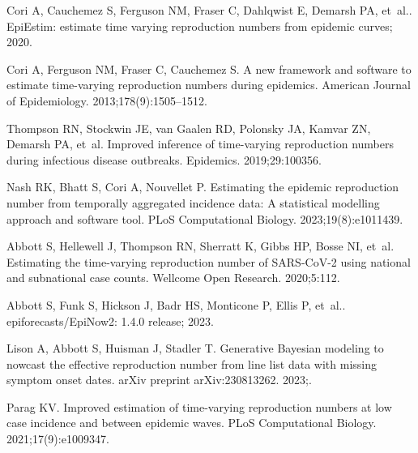 \documentclass[10pt,letterpaper]{article}
\begin{document}
\nolinenumbers

%
%
% 
\begin{thebibliography}{10}

  Cori A, Cauchemez S, Ferguson NM, Fraser C, Dahlqwist E, Demarsh PA, et~al..
    {EpiEstim}: estimate time varying reproduction numbers from epidemic curves;
    2020.
  
  Cori A, Ferguson NM, Fraser C, Cauchemez S.
  \newblock A new framework and software to estimate time-varying reproduction
    numbers during epidemics.
  \newblock American Journal of Epidemiology. 2013;178(9):1505--1512.
  
  Thompson RN, Stockwin JE, van Gaalen RD, Polonsky JA, Kamvar ZN, Demarsh PA,
    et~al.
  \newblock Improved inference of time-varying reproduction numbers during
    infectious disease outbreaks.
  \newblock Epidemics. 2019;29:100356.
  
  Nash RK, Bhatt S, Cori A, Nouvellet P.
  \newblock Estimating the epidemic reproduction number from temporally
    aggregated incidence data: A statistical modelling approach and software
    tool.
  \newblock PLoS Computational Biology. 2023;19(8):e1011439.
  
  Abbott S, Hellewell J, Thompson RN, Sherratt K, Gibbs HP, Bosse NI, et~al.
  \newblock Estimating the time-varying reproduction number of {SARS-CoV-2} using
    national and subnational case counts.
  \newblock Wellcome Open Research. 2020;5:112.
  
  Abbott S, Funk S, Hickson J, Badr HS, Monticone P, Ellis P, et~al..
    epiforecasts/{EpiNow2}: 1.4.0 release; 2023.
  
  Lison A, Abbott S, Huisman J, Stadler T.
  \newblock Generative {B}ayesian modeling to nowcast the effective reproduction
    number from line list data with missing symptom onset dates.
  \newblock arXiv preprint arXiv:230813262. 2023;.
  
  Parag KV.
  \newblock Improved estimation of time-varying reproduction numbers at low case
    incidence and between epidemic waves.
  \newblock PLoS Computational Biology. 2021;17(9):e1009347.
  

\end{thebibliography}
\end{document}
